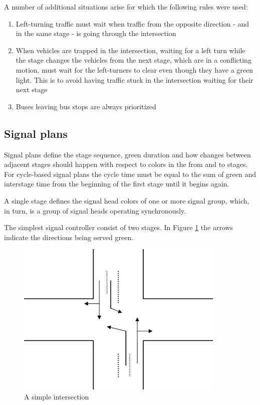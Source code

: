 A number of additional situations arise for which the following rules were used:

\begin{enumerate}
\item Left-turning traffic must wait when traffic from the opposite direction - and in the same stage - is going through the intersection
\item When vehicles are trapped in the intersection, waiting for a left turn while the stage changes the vehicles from the next stage, which are in a conflicting motion, must wait for the left-turners to clear even though they have a green light. This is to avoid having traffic stuck in the intersection waiting for their next stage
\item Buses leaving bus stops are always prioritized
\end{enumerate}

\subsection{Signal plans}
Signal plans define the stage sequence, green duration and how changes between adjacent stages should happen with respect to colors in the from and to stages. For cycle-based signal plans the cycle time must be equal to the sum of green and interstage time from the beginning of the first stage until it begins again.

A single stage defines the signal head colors of one or more signal group, which, in turn, is a group of signal heads operating synchronously.

The simplest signal controller consist of two stages. In  Figure \ref{fig:simple_intersection} the arrows indicate the directions being served green.

\begin{figure}[!ht]
\centering
\includegraphics[scale=0.5]{simple_intersection.png} 
\caption{A simple intersection}
\label{fig:simple_intersection}
\end{figure}

